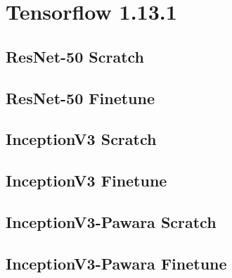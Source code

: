 \section{Tensorflow 1.13.1}

\subsection{ResNet-50 Scratch}
\begin{figure}[H]

\end{figure}

\subsection{ResNet-50 Finetune}
\begin{figure}[H]

\end{figure}

\newpage

\subsection{InceptionV3 Scratch}
\begin{figure}[H]

\end{figure}
\subsection{InceptionV3 Finetune}
\begin{figure}[H]

\end{figure}



\subsection{InceptionV3-Pawara Scratch}
\begin{figure}[H]

\end{figure}

\subsection{InceptionV3-Pawara Finetune}
\begin{figure}[H]

\end{figure}












